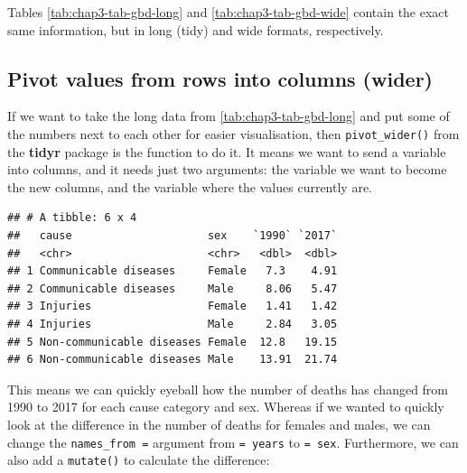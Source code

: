 \documentclass[
  12pt,
  krantz2]{krantz}
\makeatletter
\newenvironment{Shaded}{\begin{snugshade}}{\end{snugshade}}
\newcommand{\DataTypeTok}[1]{\textcolor[rgb]{0.13,0.29,0.53}{#1}}
\newcommand{\KeywordTok}[1]{\textcolor[rgb]{0.13,0.29,0.53}{\textbf{#1}}}
\newcommand{\NormalTok}[1]{#1}
\newcommand{\OperatorTok}[1]{\textcolor[rgb]{0.81,0.36,0.00}{\textbf{#1}}}
\newcommand{\StringTok}[1]{\textcolor[rgb]{0.31,0.60,0.02}{#1}}
\newenvironment{kframe}{%
\medskip{}
\setlength{\fboxsep}{.8em}
 \def\at@end@of@kframe{}%
 \ifinner\ifhmode%
  \def\at@end@of@kframe{\end{minipage}}%
  \begin{minipage}{\columnwidth}%
 \fi\fi%
 \def\FrameCommand##1{\hskip\@totalleftmargin \hskip-\fboxsep
 \colorbox{shadecolor}{##1}\hskip-\fboxsep
     \hskip-\linewidth \hskip-\@totalleftmargin \hskip\columnwidth}%
 \MakeFramed {\advance\hsize-\width
   \@totalleftmargin\z@ \linewidth\hsize
   \@setminipage}}%
 {\par\unskip\endMakeFramed%
 \at@end@of@kframe}
\renewenvironment{Shaded}{\begin{kframe}}{\end{kframe}}
\makeatother
\begin{document}
Tables \ref{tab:chap3-tab-gbd-long} and \ref{tab:chap3-tab-gbd-wide} contain the exact same information, but in long (tidy) and wide formats, respectively.

\hypertarget{pivot-values-from-rows-into-columns-wider}{%
\subsection{Pivot values from rows into columns (wider)}\label{pivot-values-from-rows-into-columns-wider}}


If we want to take the long data from \ref{tab:chap3-tab-gbd-long} and put some of the numbers next to each other for easier visualisation, then \texttt{pivot\_wider()} from the \textbf{tidyr} package is the function to do it.
It means we want to send a variable into columns, and it needs just two arguments: the variable we want to become the new columns, and the variable where the values currently are.

\begin{Shaded}
\end{Shaded}

\begin{verbatim}
## # A tibble: 6 x 4
##   cause                     sex    `1990` `2017`
##   <chr>                     <chr>   <dbl>  <dbl>
## 1 Communicable diseases     Female   7.3    4.91
## 2 Communicable diseases     Male     8.06   5.47
## 3 Injuries                  Female   1.41   1.42
## 4 Injuries                  Male     2.84   3.05
## 5 Non-communicable diseases Female  12.8   19.15
## 6 Non-communicable diseases Male    13.91  21.74
\end{verbatim}

This means we can quickly eyeball how the number of deaths has changed from 1990 to 2017 for each cause category and sex.
Whereas if we wanted to quickly look at the difference in the number of deaths for females and males, we can change the \texttt{names\_from\ =} argument from \texttt{=\ years} to \texttt{=\ sex}.
Furthermore, we can also add a \texttt{mutate()} to calculate the difference:
\end{document}
